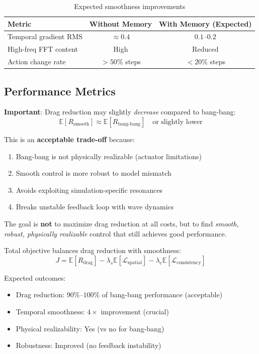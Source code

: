 \documentclass[11pt,a4paper]{article}
\newcommand{\E}{\mathbb{E}}
\theoremstyle{definition}
\begin{document}
\begin{table}[h]
\centering
\begin{tabular}{lcc}
\toprule
Metric & Without Memory & With Memory (Expected) \\
\midrule
Temporal gradient RMS & $\approx 0.4$ & $0.1$--$0.2$ \\
High-freq FFT content & High & Reduced \\
Action change rate & $> 50\%$ steps & $< 20\%$ steps \\
\bottomrule
\end{tabular}
\caption{Expected smoothness improvements}
\end{table}

\subsection{Performance Metrics}

\textbf{Important}: Drag reduction may slightly \emph{decrease} compared to bang-bang:
\begin{equation}
    \E[R_{\text{smooth}}] \approx \E[R_{\text{bang-bang}}] \quad \text{or slightly lower}
\end{equation}

This is an \textbf{acceptable trade-off} because:
\begin{enumerate}
    \item Bang-bang is not physically realizable (actuator limitations)
    \item Smooth control is more robust to model mismatch
    \item Avoids exploiting simulation-specific resonances
    \item Breaks unstable feedback loop with wave dynamics
\end{enumerate}

The goal is \textbf{not} to maximize drag reduction at all costs, but to find \emph{smooth, robust, physically realizable} control that still achieves good performance.

Total objective balances drag reduction with smoothness:
\begin{equation}
    J = \E[R_{\text{drag}}] - \lambda_s \E[\mathcal{L}_{\text{spatial}}] - \lambda_c \E[\mathcal{L}_{\text{consistency}}]
\end{equation}

Expected outcomes:
\begin{itemize}
    \item Drag reduction: $90\%$--$100\%$ of bang-bang performance (acceptable)
    \item Temporal smoothness: $4\times$ improvement (crucial)
    \item Physical realizability: Yes (vs no for bang-bang)
    \item Robustness: Improved (no feedback instability)
\end{itemize}
\end{document}

